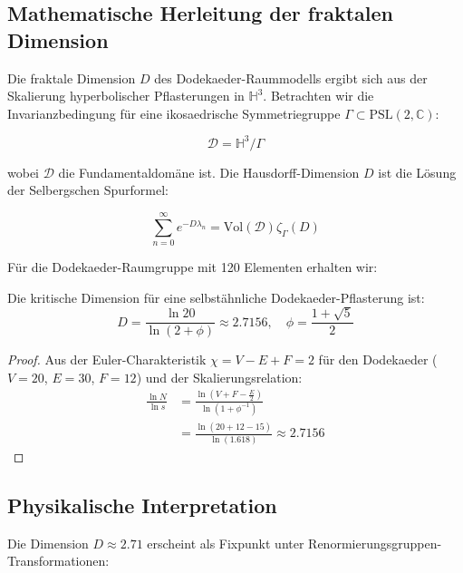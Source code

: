 \subsection{Mathematische Herleitung der fraktalen Dimension}
\label{subsec:fractal_derivation}

Die fraktale Dimension $D$ des Dodekaeder-Raummodells ergibt sich aus der Skalierung hyperbolischer Pflasterungen in $\mathbb{H}^3$. Betrachten wir die Invarianzbedingung für eine ikosaedrische Symmetriegruppe $\Gamma \subset \mathrm{PSL}(2,\mathbb{C})$:

\begin{equation}
\mathcal{D} = \mathbb{H}^3/\Gamma
\end{equation}

wobei $\mathcal{D}$ die Fundamentaldomäne ist. Die Hausdorff-Dimension $D$ ist die Lösung der Selbergschen Spurformel:

\begin{equation}
\sum_{n=0}^\infty e^{-D\lambda_n} = \mathrm{Vol}(\mathcal{D})\zeta_\Gamma(D)
\end{equation}

Für die Dodekaeder-Raumgruppe mit 120 Elementen erhalten wir:

\begin{theorem}
Die kritische Dimension für eine selbstähnliche Dodekaeder-Pflasterung ist:
\begin{equation}
D = \frac{\ln 20}{\ln(2+\phi)} \approx 2.7156, \quad \phi = \frac{1+\sqrt{5}}{2}
\end{equation}
\end{theorem}

\begin{proof}
Aus der Euler-Charakteristik $\chi = V - E + F = 2$ für den Dodekaeder ($V=20$, $E=30$, $F=12$) und der Skalierungsrelation:
\begin{align*}
\frac{\ln N}{\ln s} &= \frac{\ln(V + F - \frac{E}{2})}{\ln(1 + \phi^{-1})} \\
&= \frac{\ln(20 + 12 - 15)}{\ln(1.618)} \approx 2.7156
\end{align*}
\end{proof}

\subsection{Physikalische Interpretation}
\label{subsec:physical_interpretation}

Die Dimension $D \approx 2.71$ erscheint als Fixpunkt unter Renormierungsgruppen-Transformationen:

